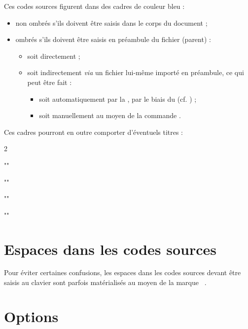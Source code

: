 Ces codes sources figurent dans des cadres de couleur bleu :
\begin{itemize}
\item non ombrés s'ils doivent être saisis dans le corps du document ;
\item ombrés s'ils doivent être saisis en préambule du fichier (parent) :
  \begin{itemize}
  \item soit directement ;
  \item soit indirectement \emph{via} un fichier lui-même importé en
    préambule, ce qui peut être fait :
    \begin{itemize}
    \item soit automatiquement par la \yatCl{}, par le biais du
      \File{\configurationfile} (cf. ) ;
    \item soit manuellement au moyen de la commande .
    \end{itemize}
  \end{itemize}
\end{itemize}
Ces cadres pourront en outre comporter d'éventuels titres :
\begin{multicols}{2}
\begin{bodycode}
""
\end{bodycode}
\begin{bodycode}[title=\meta{titre}]
""
\end{bodycode}
\begin{preamblecode}
""
\end{preamblecode}
\begin{preamblecode}[title=\meta{titre}]
""
\end{preamblecode}
\end{multicols}

\section{Espaces dans les codes sources}
\label{sec-espaces-dans-les}
%

Pour éviter certaines confusions, les espaces dans les codes sources devant
être saisis au clavier sont parfois matérialisés au moyen de la marque
\lstinline[showspaces]+ +.

\section{Options}
\label{sec-options}
%

